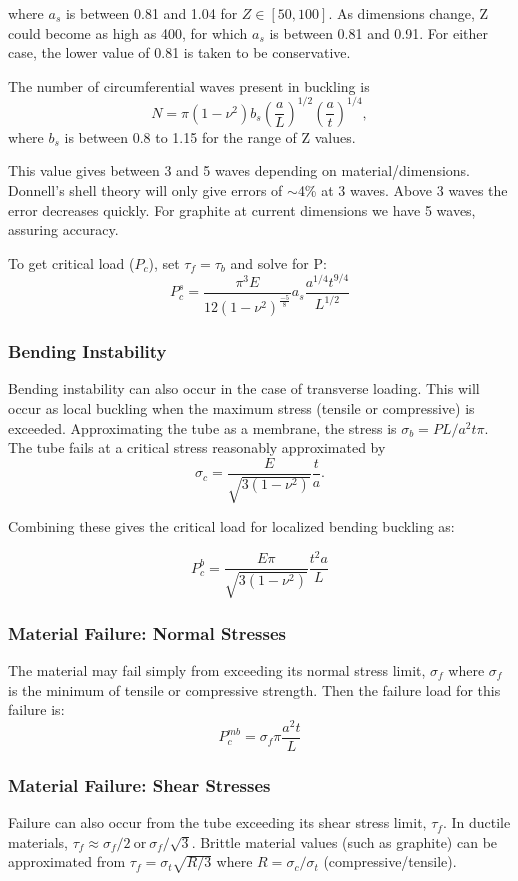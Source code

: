 \documentclass{report}
\begin{document}
where $a_{s}$ is between 0.81 and 1.04 for $Z \in [50,100]$. As dimensions change, Z could become as high as 400, for which $a_{s}$ is between 0.81 and 0.91. For either case, the lower value of 0.81 is taken to be conservative.

The number of circumferential waves present in buckling is
$$
N = \pi(1-\nu^2)b_{s}\left(\frac{a}{L}\right)^{1/2}\left(\frac{a}{t}\right)^{1/4},
$$
where $b_{s}$ is between 0.8 to 1.15 for the range of Z values.

This value gives between 3 and 5 waves depending on material/dimensions. Donnell's shell theory will only give errors of $\sim$4\% at 3 waves. Above 3 waves the error decreases
quickly. For graphite at current dimensions we have 5 waves, assuring accuracy.

To get critical load ($P_{c}$), set $\tau_{f} = \tau_{b}$ and solve for P:
$$
P_{c}^{s} = \frac{\pi^3E}{12(1-\nu^2)^{\frac{-5}{8}}}a_{s}\frac{a^{1/4}t^{9/4}}{L^{1/2}}
$$

\subsubsection{Bending Instability}

Bending instability can also occur in the case of transverse loading. This will occur as local buckling when the maximum stress (tensile or compressive) is exceeded. Approximating the tube as a membrane, the stress is $\sigma_{b} = PL/a^2t\pi$. The tube fails at a critical stress reasonably approximated by
$$
\sigma_{c}=\frac{E}{\sqrt{3(1-\nu^2)}}\frac{t}{a}.
$$

Combining these gives the critical load for localized bending buckling as:

$$
P_{c}^{b} = \frac{E \pi}{\sqrt{3(1-\nu^2)}}\frac{t^2a}{L}
$$
\subsubsection{Material Failure: Normal Stresses}

The material may fail simply from exceeding its normal stress limit, $\sigma_{f}$ where $\sigma_{f}$ is the minimum of tensile or compressive strength. Then the failure load for this failure is:
$$
P_{c}^{mb} = \sigma_{f} \pi \frac{a^2t}{L}
$$
\subsubsection{Material Failure: Shear Stresses}

Failure can also occur from the tube exceeding its shear stress limit, $\tau_{f}$. In ductile materials, $\tau_{f} \approx \sigma_{f}/2 \ \text{or} \ \sigma_{f}/\sqrt{3}$. Brittle material values (such as graphite) can be approximated from $\tau_{f} = \sigma_{t}\sqrt{R/3} $ where $R = \sigma_{c}/\sigma_{t}$ (compressive/tensile).
\end{document}
